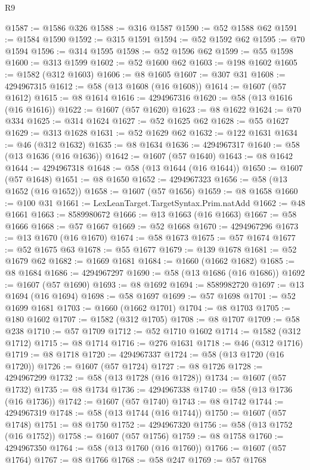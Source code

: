\begin{lexlean}{R9}
\begin{coremodule}
@1587 := @1586 @326
@1588 := @316 @1587
@1590 := @52 @1588 @62
@1591 := @1584 @1590
@1592 := @315 @1591
@1594 := @52 @1592 @62
@1595 := @70 @1594
@1596 := @314 @1595
@1598 := @52 @1596 @62
@1599 := @55 @1598
@1600 := @313 @1599
@1602 := @52 @1600 @62
@1603 := @198 @1602
@1605 := @1582 (@312 @1603)
@1606 := @8 @1605
@1607 := @307 @31
@1608 := 4294967315
@1612 := @58 (@13 @1608 (@16 @1608))
@1614 := @1607 (@57 @1612)
@1615 := @8 @1614
@1616 := 4294967316
@1620 := @58 (@13 @1616 (@16 @1616))
@1622 := @1607 (@57 @1620)
@1623 := @8 @1622
@1624 := @70 @334
@1625 := @314 @1624
@1627 := @52 @1625 @62
@1628 := @55 @1627
@1629 := @313 @1628
@1631 := @52 @1629 @62
@1632 := @122 @1631
@1634 := @46 (@312 @1632)
@1635 := @8 @1634
@1636 := 4294967317
@1640 := @58 (@13 @1636 (@16 @1636))
@1642 := @1607 (@57 @1640)
@1643 := @8 @1642
@1644 := 4294967318
@1648 := @58 (@13 @1644 (@16 @1644))
@1650 := @1607 (@57 @1648)
@1651 := @8 @1650
@1652 := 4294967323
@1656 := @58 (@13 @1652 (@16 @1652))
@1658 := @1607 (@57 @1656)
@1659 := @8 @1658
@1660 := @100 @31
@1661 := LexLeanTarget.TargetSyntax.Prim.natAdd
@1662 := @48 @1661
@1663 := 8589980672
@1666 := @13 @1663 (@16 @1663)
@1667 := @58 @1666
@1668 := @57 @1667
@1669 := @52 @1668
@1670 := 4294967296
@1673 := @13 @1670 (@16 @1670)
@1674 := @58 @1673
@1675 := @57 @1674
@1677 := @52 @1675 @63
@1678 := @55 @1677
@1679 := @139 @1678
@1681 := @52 @1679 @62
@1682 := @1669 @1681
@1684 := @1660 (@1662 @1682)
@1685 := @8 @1684
@1686 := 4294967297
@1690 := @58 (@13 @1686 (@16 @1686))
@1692 := @1607 (@57 @1690)
@1693 := @8 @1692
@1694 := 8589982720
@1697 := @13 @1694 (@16 @1694)
@1698 := @58 @1697
@1699 := @57 @1698
@1701 := @52 @1699 @1681
@1703 := @1660 (@1662 @1701)
@1704 := @8 @1703
@1705 := @180 @1602
@1707 := @1582 (@312 @1705)
@1708 := @8 @1707
@1709 := @58 @238
@1710 := @57 @1709
@1712 := @52 @1710 @1602
@1714 := @1582 (@312 @1712)
@1715 := @8 @1714
@1716 := @276 @1631
@1718 := @46 (@312 @1716)
@1719 := @8 @1718
@1720 := 4294967337
@1724 := @58 (@13 @1720 (@16 @1720))
@1726 := @1607 (@57 @1724)
@1727 := @8 @1726
@1728 := 4294967299
@1732 := @58 (@13 @1728 (@16 @1728))
@1734 := @1607 (@57 @1732)
@1735 := @8 @1734
@1736 := 4294967338
@1740 := @58 (@13 @1736 (@16 @1736))
@1742 := @1607 (@57 @1740)
@1743 := @8 @1742
@1744 := 4294967319
@1748 := @58 (@13 @1744 (@16 @1744))
@1750 := @1607 (@57 @1748)
@1751 := @8 @1750
@1752 := 4294967320
@1756 := @58 (@13 @1752 (@16 @1752))
@1758 := @1607 (@57 @1756)
@1759 := @8 @1758
@1760 := 4294967350
@1764 := @58 (@13 @1760 (@16 @1760))
@1766 := @1607 (@57 @1764)
@1767 := @8 @1766
@1768 := @58 @247
@1769 := @57 @1768

\end{coremodule}
\end{lexlean}
